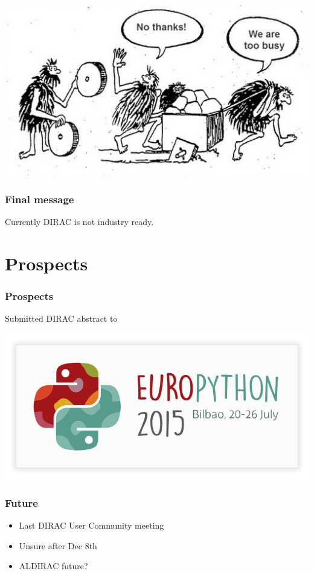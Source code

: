 \documentclass[14pt]{beamer}
\begin{document}
\begin{frame}

\centering
\includegraphics[width=\textwidth]{wheel.png}

\end{frame}

\begin{frame}
\frametitle{Final message}
\centering
Currently DIRAC is not industry ready.
\end{frame}

\section{Prospects}
\begin{frame}
\frametitle{Prospects}
Submitted DIRAC abstract to

\centering
\includegraphics[width=\textwidth]{europython-2015-logo-white-bg.png}
\end{frame}

\begin{frame}
\frametitle{Future}
\begin{itemize}
\item Last DIRAC User Community meeting
\item Unsure after Dec 8th
\item ALDIRAC future?
\end{itemize} 
\end{frame}
\end{document}
